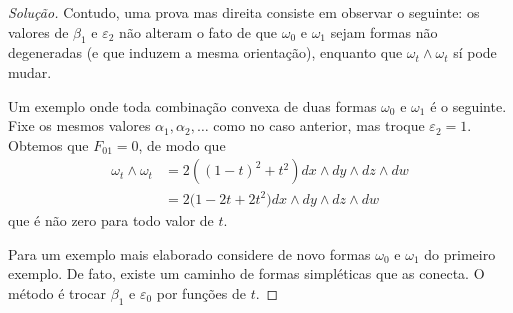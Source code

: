 \begin{proof}[Solução]
Contudo, uma prova mas direita consiste em observar o seguinte: os valores de $\beta_1$ e $\varepsilon_2$ não alteram o fato de que $\omega_0$ e $\omega_1$ sejam formas não degeneradas (e que induzem a mesma orientação), enquanto que $\omega_t\wedge \omega_t$ sí pode mudar.

Um exemplo onde toda combinação convexa de duas formas  $\omega_0$ e $\omega_1$ é o seguinte. Fixe os mesmos valores $\alpha_1,\alpha_2,\ldots$ como no caso anterior, mas troque $\varepsilon_2=1$. Obtemos que $F_{01}=0$, de modo que
\begin{align*}
\omega_t\wedge \omega_t&=2\left( (1-t)^2+t^2 \right)  dx\wedge dy\wedge dz\wedge dw\\
&=2\Big( 1-2t+2t^2 \Big)dx\wedge dy\wedge dz\wedge dw
\end{align*}
que é não zero para todo valor de $t$.

Para um exemplo mais elaborado considere de novo formas $\omega_0$ e $\omega_1$ do primeiro exemplo. De fato, existe um caminho de formas simpléticas que as conecta. O método é trocar $\beta_1$ e $\varepsilon_0$ por funções de $t$.


\end{proof}
